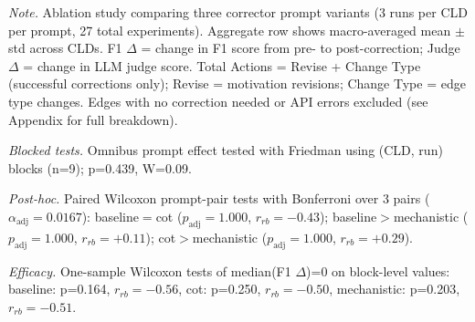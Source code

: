 \begin{table}[H]
\centreing
\begin{minipage}{\linewidth}
\centreing
\caption{Corrector Prompt Ablation on Ground Truth: Performance Comparison}
\label{tab:rq1b_prompt_ablation_groundtruth}
\begin{threeparttable}
\end{threeparttable}
\vspace{0.5em}
\footnotesize
\textit{Note.} Ablation study comparing three corrector prompt variants (3 runs per CLD per prompt, 27 total experiments). 
Aggregate row shows macro-averaged mean $\pm$ std across CLDs.
F1 $\Delta$ = change in F1 score from pre- to post-correction; Judge $\Delta$ = change in LLM judge score.
Total Actions = Revise + Change Type (successful corrections only); Revise = motivation revisions; Change Type = edge type changes.
Edges with no correction needed or API errors excluded (see Appendix for full breakdown).\par
\textit{Blocked tests.} Omnibus prompt effect tested with Friedman using (CLD, run) blocks (n=9); p=0.439, W=0.09.\par
\textit{Post-hoc.} Paired Wilcoxon prompt-pair tests with Bonferroni over 3 pairs ($\alpha_{\text{adj}}=0.0167$): baseline$=$cot ($p_{\text{adj}}=1.000$, $r_{rb}=-0.43$); baseline$>$mechanistic ($p_{\text{adj}}=1.000$, $r_{rb}=+0.11$); cot$>$mechanistic ($p_{\text{adj}}=1.000$, $r_{rb}=+0.29$).\par
\textit{Efficacy.} One-sample Wilcoxon tests of median(F1 $\Delta$)=0 on block-level values: baseline: p=0.164, $r_{rb}=-0.56$, cot: p=0.250, $r_{rb}=-0.50$, mechanistic: p=0.203, $r_{rb}=-0.51$.

\end{minipage}
\end{table}
